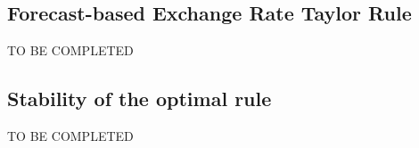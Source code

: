 \documentclass{article}
\begin{document}
\subsection{Forecast-based Exchange Rate Taylor Rule}

TO BE COMPLETED

\subsection{Stability of the optimal rule}

TO BE COMPLETED
\end{document}
